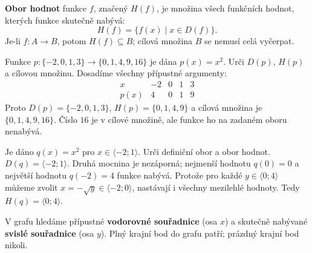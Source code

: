 \documentclass[11pt,a4paper]{article}
\begin{document}

\begin{definiceBox}[title={Definice - Obor hodnot funkce}]
\textbf{Obor hodnot} funkce $f$, značený $H(f)$, je množina všech
funkčních hodnot, kterých funkce skutečně nabývá:
\[
H(f)=\{f(x)\mid x\in D(f)\}.
\]
Je-li $f\colon A\to B$, potom $H(f)\subseteq B$; cílová množina $B$
se nemusí celá vyčerpat.
\end{definiceBox}

\begin{prikladReseniBox}[title={Příklad 3}]
Funkce $p\colon\{-2,0,1,3\}\to\{0,1,4,9,16\}$ je dána
$p(x)=x^2$. Urči $D(p)$, $H(p)$ a cílovou množinu.
\tcblower
Dosadíme všechny přípustné argumenty:
\[
\begin{array}{c|rrrr}
x&-2&0&1&3\\ \hline
p(x)&4&0&1&9
\end{array}
\]
Proto $D(p)=\{-2,0,1,3\}$, $H(p)=\{0,1,4,9\}$ a cílová množina
je $\{0,1,4,9,16\}$. Číslo $16$ je v cílové množině, ale funkce
ho na zadaném oboru nenabývá.
\end{prikladReseniBox}

\begin{prikladReseniBox}[title={Příklad 4}]
Je dáno $q(x)=x^2$ pro $x\in\langle-2;1\rangle$.
Urči definiční obor a obor hodnot.
\tcblower
$D(q)=\langle-2;1\rangle$. Druhá mocnina je nezáporná;
nejmenší hodnotu $q(0)=0$ a největší hodnotu $q(-2)=4$ funkce
nabývá. Protože pro každé $y\in\langle0;4\rangle$ můžeme zvolit
$x=-\sqrt y\in\langle-2;0\rangle$, nastávají i všechny mezilehlé
hodnoty. Tedy $H(q)=\langle0;4\rangle$.
\end{prikladReseniBox}

V grafu hledáme přípustné \textbf{vodorovné souřadnice} (osa $x$) a
skutečně nabývané \textbf{svislé souřadnice} (osa $y$).
Plný krajní bod do grafu patří; prázdný krajní bod nikoli.

\begin{center}
\end{center}
\end{document}
